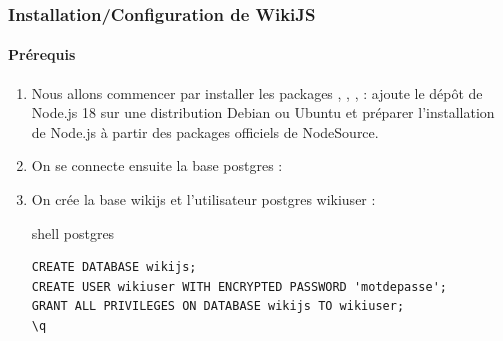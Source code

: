 \documentclass{article}
\begin{document}
\subsubsection{Installation/Configuration de WikiJS}

\paragraph{Prérequis\\}

\begin{enumerate}
	\item Nous allons commencer par installer les packages , ,  ,  :
ajoute le dépôt de Node.js 18 sur une distribution Debian ou Ubuntu et préparer l’installation de Node.js à partir des packages officiels de NodeSource.
	\item On se connecte ensuite la base postgres : 
	\item On crée la base wikijs et l'utilisateur postgres wikiuser :
	\begin{codebox}{shell postgres}
\begin{lstlisting}
CREATE DATABASE wikijs;
CREATE USER wikiuser WITH ENCRYPTED PASSWORD 'motdepasse';
GRANT ALL PRIVILEGES ON DATABASE wikijs TO wikiuser;
\q
\end{lstlisting}
\end{codebox}
\end{enumerate}
\end{document}
